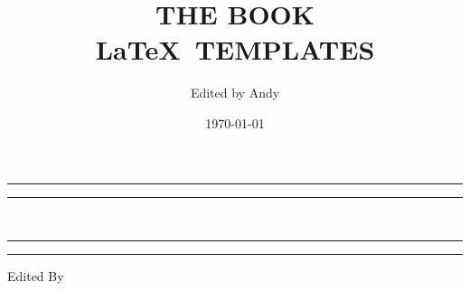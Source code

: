 \documentclass[openany,twoside,12pt]{book}
\title{THE BOOK \\[8pt] \LaTeX ~TEMPLATES}
\author{Edited by Andy}
\date{\today}
\theoremstyle{plain}
\numberwithin{equation}{chapter}
\numberwithin{figure}{chapter}
\numberwithin{table}{chapter}
\begin{document}




\begin{titlepage} %


	\centering %
	
	\scshape %
	
	\vspace*{2\baselineskip} %
	
	
	\rule{\textwidth}{1.6pt}\vspace*{-\baselineskip}\vspace*{2pt} %
	\rule{\textwidth}{0.4pt} %
	
	\vspace{0.75\baselineskip} %
	
    \makeatletter

	{\LARGE\bfseries \@title \\} %
	
	\vspace{0.75\baselineskip} %
	
	\rule{\textwidth}{0.4pt}\vspace*{-\baselineskip}\vspace{3.2pt} %
	\rule{\textwidth}{1.6pt} %
	
	\vspace{5\baselineskip} %

	
	Edited By
	
	\vspace{0.5\baselineskip} %
	

\end{titlepage}
\end{document}
